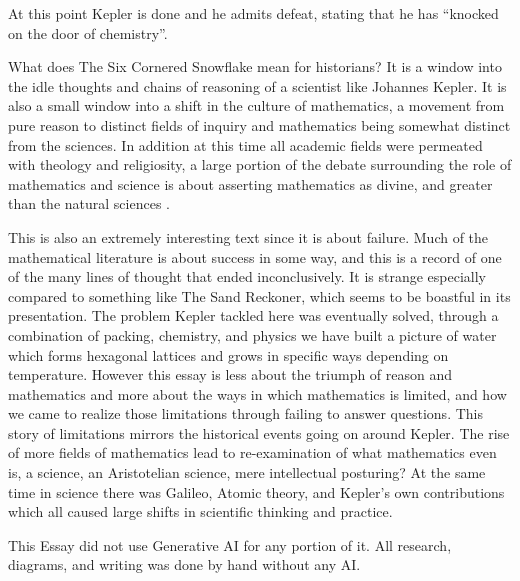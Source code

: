 \documentclass{report}
\begin{document}
At this point Kepler is done and he admits defeat, stating that he has “knocked on the door of chemistry”\cite[p.45]{kepflake}. 

What does The Six Cornered Snowflake mean for historians? It is a window into the idle thoughts and chains of reasoning of a 
scientist like Johannes Kepler. It is also a small window into a shift in the culture of mathematics, a movement from pure reason 
to distinct fields of inquiry and mathematics being somewhat distinct from the sciences. In addition at this time all academic fields 
were permeated with theology and religiosity, a large portion of the debate surrounding the role of mathematics and science is about 
asserting mathematics as divine, and greater than the natural sciences \cite[p.20]{math17} \cite{snow}.

This is also an extremely interesting text since it is about failure. Much of the mathematical literature is about success in some way, and this is a record of one of the many lines of thought that ended inconclusively. It is strange especially compared to something like The Sand Reckoner, which seems to be boastful in its presentation. The problem Kepler tackled here was eventually solved, through a combination of packing, chemistry, and physics we have built a picture of water which forms hexagonal lattices and grows in specific ways depending on temperature. However this essay is less about the triumph of reason and mathematics and more about the ways in which mathematics is limited, and how we came to realize those limitations through failing to answer questions. This story of limitations mirrors the historical events going on around Kepler. The rise of more fields of mathematics lead to re-examination of what mathematics even is, a science, an Aristotelian science, mere intellectual posturing? At the same time in science there was Galileo, Atomic theory, and Kepler’s own contributions which all caused large shifts in scientific thinking and practice.

\printbibliography


\begin{mdframed}
    This Essay did not use Generative AI for any portion of it. All research, diagrams,
    and writing was done by hand without any AI.
\end{mdframed}
\end{document}
